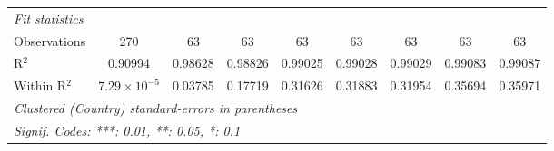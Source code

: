 \begin{table}[htbp]
\begin{tabular}{lcccccccc}
      \midrule
      \emph{Fit statistics}\\
      Observations                                                                       & 270                   & 63       & 63             & 63             & 63             & 63             & 63             & 63\\  
      R$^2$                                                                              & 0.90994               & 0.98628  & 0.98826        & 0.99025        & 0.99028        & 0.99029        & 0.99083        & 0.99087\\  
      Within R$^2$                                                                       & $7.29\times 10^{-5}$  & 0.03785  & 0.17719        & 0.31626        & 0.31883        & 0.31954        & 0.35694        & 0.35971\\  
      \midrule \midrule
      \multicolumn{9}{l}{\emph{Clustered (Country) standard-errors in parentheses}}\\
      \multicolumn{9}{l}{\emph{Signif. Codes: ***: 0.01, **: 0.05, *: 0.1}}\\
   \end{tabular}
\end{table}


